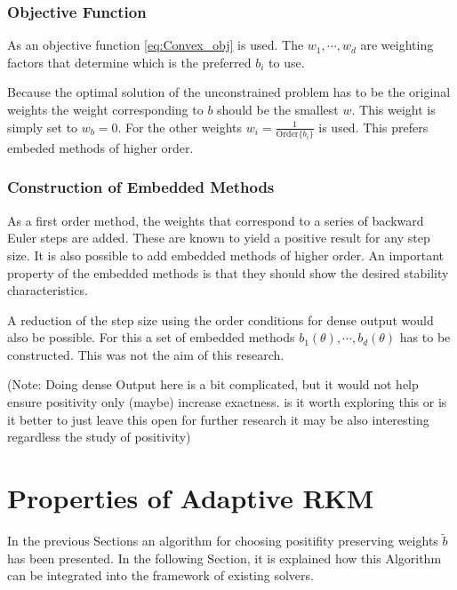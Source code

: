 \documentclass[a4paper]{article}
\numberwithin{equation}{section}
\theoremstyle{plain}
\theoremstyle{definition}
\numberwithin{theorem}{section}
\newcommand{\1}{\mathbbm{1}}
\begin{document}
\subsubsection{Objective Function}

As an objective function \eqref{eq:Convex_obj}
is used.  The $w_1,\cdots,w_d$ are weighting factors that determine which is the preferred $b_i$ to use.

Because the optimal solution of the unconstrained problem has to be the original weights the weight corresponding to $b$ should be the smallest $w$. This weight is simply set to $w_{b} = 0$. For the other weights $w_i = \frac{1}{\mathrm{Order} \{b_i\}}$ is used. This prefers embeded methods of higher order.

\subsubsection{Construction of Embedded Methods}

As a first order method, the weights that correspond to a series of backward Euler steps are added. These are known to yield a positive result for any step size.
It is also possible to add embedded methods of higher order.
An important property of the embedded methods is that they should show the desired stability characteristics. 

A reduction of the step size using the order conditions for dense output would also be possible. For this a set of embedded methods $b_1(\theta),\cdots,b_d(\theta)$ has to be constructed. This was not the aim of this research.

(Note: Doing dense Output here is a bit complicated, but it would not help ensure positivity only (maybe) increase exactness.  is it worth exploring this or is it better to just leave this open for further research it may be also interesting regardless the study of positivity)
 
\section{Properties of Adaptive RKM} \label{sec:integration}

In the previous Sections an algorithm for choosing positifity preserving weights $\tilde{b}$ has been presented. 
In the following Section, it is explained how this Algorithm can be integrated into the framework of existing solvers.
\end{document}
